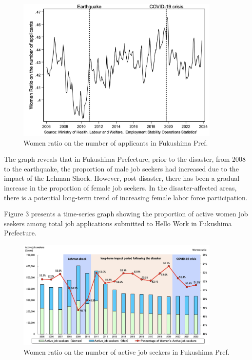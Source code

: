 \documentclass[12pt,halfline,a4paper]{ouparticle}
\begin{document}
\begin{figure}[h!]
    \centering
    \includegraphics[width=0.9\textwidth]{Women ratio on the number of applicants in Fukushima2.jpeg}  %
    \caption{Women ratio on the number of applicants in Fukushima Pref.}
    \label{fig:women_ratio_fukushima}
\end{figure}


The graph reveals that in Fukushima Prefecture, prior to the disaster, from 2008 to the earthquake, the proportion of male job seekers had increased due to the impact of the Lehman Shock. However, post-disaster, there has been a gradual increase in the proportion of female job seekers. In the disaster-affected areas, there is a potential long-term trend of increasing female labor force participation.

Figure 3 presents a time-series graph showing the proportion of active women job seekers among total job applications submitted to Hello Work in Fukushima Prefecture.

\begin{figure}[h!]
    \centering
    \includegraphics[width=0.9\textwidth]{Women ratio on the number of active job seekers2}  %
    \caption{Women ratio on the number of active job seekers in Fukushima Pref.}
    \label{fig:women_ratio_fukushima}
\end{figure}
\end{document}
